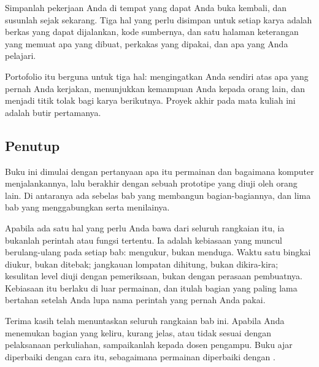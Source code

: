 Simpanlah pekerjaan Anda di tempat yang dapat Anda buka kembali, dan susunlah
sejak sekarang. Tiga hal yang perlu disimpan untuk setiap karya adalah berkas
yang dapat dijalankan, kode sumbernya, dan satu halaman keterangan yang memuat
apa yang dibuat, perkakas yang dipakai, dan apa yang Anda pelajari.

Portofolio itu berguna untuk tiga hal: mengingatkan Anda sendiri atas apa yang
pernah Anda kerjakan, menunjukkan kemampuan Anda kepada orang lain, dan
menjadi titik tolak bagi karya berikutnya. Proyek akhir pada mata kuliah ini
adalah butir pertamanya.

\subsection{Penutup}

Buku ini dimulai dengan pertanyaan apa itu permainan dan bagaimana komputer
menjalankannya, lalu berakhir dengan sebuah prototipe yang diuji oleh orang
lain. Di antaranya ada sebelas bab yang membangun bagian-bagiannya, dan lima
bab yang menggabungkan serta menilainya.

Apabila ada satu hal yang perlu Anda bawa dari seluruh rangkaian itu, ia
bukanlah perintah atau fungsi tertentu. Ia adalah kebiasaan yang muncul
berulang-ulang pada setiap bab: mengukur, bukan menduga. Waktu satu bingkai
diukur, bukan ditebak; jangkauan lompatan dihitung, bukan dikira-kira;
kesulitan level diuji dengan pemeriksaan, bukan dengan perasaan pembuatnya.
Kebiasaan itu berlaku di luar permainan, dan itulah bagian yang paling lama
bertahan setelah Anda lupa nama perintah yang pernah Anda pakai.

\begin{catatabox}
Terima kasih telah menuntaskan seluruh rangkaian bab ini. Apabila Anda
menemukan bagian yang keliru, kurang jelas, atau tidak sesuai dengan
pelaksanaan perkuliahan, sampaikanlah kepada dosen pengampu. Buku ajar
diperbaiki dengan cara itu, sebagaimana permainan diperbaiki dengan
.
\end{catatabox}
